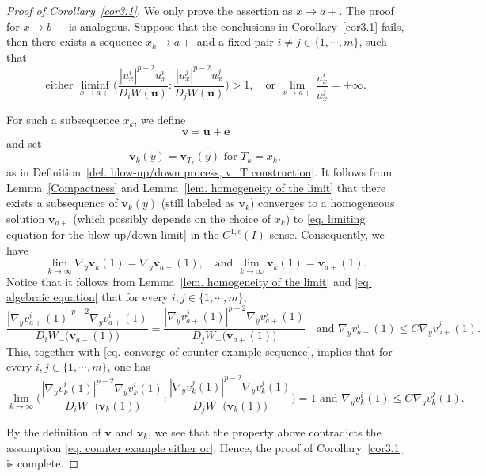 \documentclass[11pt,twoside,reqno]{amsart}
\newcounter{assu}
\numberwithin{equation}{section}
\begin{document}
\begin{proof}[Proof of Corollary~\ref{cor3.1}]
We only prove the assertion as $x\to a+$. The proof for $x\to b-$ is analogous. Suppose that the conclusions in Corollary~\ref{cor3.1} fails, then there exists a sequence $x_{k}\to a+$ and a fixed pair $i\neq j\in\{1,\cdots,m\}$, such that
\begin{equation}\label{eq. counter example either or}
    \mbox{either }\liminf_{x\to a+}\Big(\frac{|u_{x}^{i}|^{p-2}u_{x}^{i}}{D_{i}W(\mathbf{u})}:\frac{|u_{x}^{j}|^{p-2}u_{x}^{j}}{D_{j}W(\mathbf{u})}\Big)>1,\quad\mbox{or }\lim_{x\to a+}\frac{u^{i}_{x}}{u^{j}_{x}}=+\infty.
\end{equation}

For such a subsequence $x_{k}$, we define $$\mathbf{v}=\mathbf{u}+\mathbf{e}$$ and set $$\mathbf{v}_{k}(y)=\mathbf{v}_{T_{k}}(y)\,\,\mbox{for}\,\, T_{k}=x_{k},$$ as in Definition~\ref{def. blow-up/down process, v_T construction}. It follows from Lemma~\ref{Compactness} and Lemma~\ref{lem. homogeneity of the limit} that there exists a subsequence of $\mathbf{v}_{k}(y)$ (still labeled as $\mathbf{v}_{k}$) converges to a homogeneous solution $\mathbf{v}_{a+}$ (which possibly depends on the choice of $x_{k}$) to \eqref{eq. limiting equation for the blow-up/down limit} in the $C^{1,\epsilon}(I)$ sense. Consequently, we have
\begin{equation}\label{eq. converge of counter example sequence}
    \lim_{k\to\infty}\nabla_{y}\mathbf{v}_{k}(1)=\nabla_{y}\mathbf{v}_{a+}(1),\quad\mbox{and }\lim_{k\to\infty}\mathbf{v}_{k}(1)=\mathbf{v}_{a+}(1).
\end{equation}
Notice that it follows from Lemma~\ref{lem. homogeneity of the limit} and \eqref{eq. algebraic equation} that for every $i,j\in\{1,\cdots,m\}$,
\begin{equation*}
    \frac{|\nabla_{y}v_{a+}^{i}(1)|^{p-2}\nabla_{y}v_{a+}^{i}(1)}{D_iW_{-}\big(\mathbf{v}_{a+}(1)\big)}=\frac{|\nabla_{y}v_{a+}^{j}(1)|^{p-2}\nabla_{y}v_{a+}^{j}(1)}{D_jW_{-}\big(\mathbf{v}_{a+}(1)\big)}\quad\mbox{and }\nabla_{y}v^{i}_{a+}(1)\leq C\nabla_{y}v^{j}_{a+}(1).
\end{equation*}
This, together with \eqref{eq. converge of counter example sequence}, implies that for every $i,j\in\{1,\cdots,m\}$, one has
\begin{equation*}
    \lim_{k\to\infty}\Big(\frac{|\nabla_{y}v_{k}^{i}(1)|^{p-2}\nabla_{y}v_{k}^{i}(1)}{D_iW_{-}\big(\mathbf{v}_{k}(1)\big)}:\frac{|\nabla_{y}v_{k}^{j}(1)|^{p-2}\nabla_{y}v_{k}^{j}(1)}{D_jW_{-}\big(\mathbf{v}_{k}(1)\big)}\Big)=1\mbox{ and }\nabla_{y}v^{i}_{k}(1)\leq C\nabla_{y}v^{j}_{k}(1).
\end{equation*}

By the definition of $\mathbf{v}$ and $\mathbf{v}_{k}$, we see that the property above contradicts the assumption \eqref{eq. counter example either or}. Hence, the proof of Corollary~\ref{cor3.1} is complete.
\end{proof}
\end{document}

